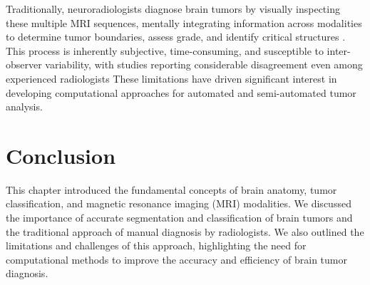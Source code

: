 Traditionally, neuroradiologists diagnose brain tumors by visually inspecting these multiple MRI sequences, mentally integrating information across modalities to determine tumor boundaries, assess grade, and identify critical structures \cite{DeAngelis2001}. This process is inherently subjective, time-consuming, and susceptible to inter-observer variability, with studies reporting considerable disagreement even among experienced radiologists  These limitations have driven significant interest in developing computational approaches for automated and semi-automated tumor analysis.

\section{Conclusion}
\label{sec:conclusion}

This chapter introduced the fundamental concepts of brain anatomy, tumor classification, and magnetic resonance imaging (MRI) modalities. We discussed the importance of accurate segmentation and classification of brain tumors and the traditional approach of manual diagnosis by radiologists. We also outlined the limitations and challenges of this approach, highlighting the need for computational methods to improve the accuracy and efficiency of brain tumor diagnosis.


